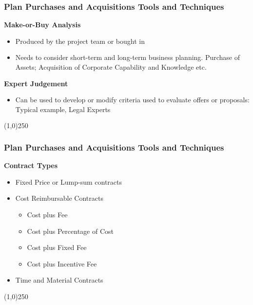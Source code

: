 \begin{frame}
\frametitle{Plan Purchases and Acquisitions \hfill\hfill Tools and Techniques}
\textbf{Make-or-Buy Analysis}
		\begin{itemize}
		\item Produced by the project team or bought in
		\item Needs to consider short-term and long-term business planning.  Purchase of Assets; Acquisition of Corporate Capability and Knowledge etc. 
		\end{itemize}
\textbf{Expert Judgement}
		\begin{itemize}
			\item Can be used to develop or modify criteria used to evaluate offers or proposals: Typical example, Legal Experts
		\end{itemize}
\end{frame}\begin{center}\line(1,0){250}\end{center}



\begin{frame}
\frametitle{Plan Purchases and Acquisitions \hfill\hfill Tools and Techniques}
\textbf{Contract Types}
\begin{itemize}
	\item Fixed Price or Lump-sum contracts
	\item Cost Reimbursable Contracts
		\begin{itemize}
			\item Cost plus Fee 
			\item Cost plus Percentage of Cost
			\item Cost plus Fixed Fee
			\item Cost plus Incentive Fee
		\end{itemize}
	\item Time and Material Contracts
\end{itemize}
\end{frame}\begin{center}\line(1,0){250}\end{center}



